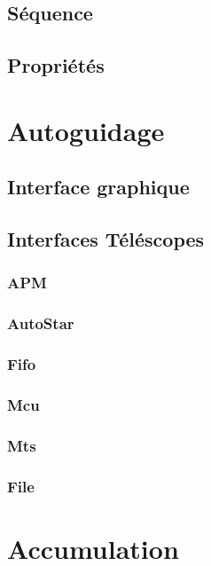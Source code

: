 \documentclass[11pt,a4paper]{book}
\begin{document}
\section{S\'equence}

\section{Propri\'et\'es}

\chapter{Autoguidage}

\section{Interface graphique}

\section{Interfaces T\'el\'escopes}

\subsection{APM}

\subsection{AutoStar}

\subsection{Fifo}

\subsection{Mcu}

\subsection{Mts}

\subsection{File}

\chapter{Accumulation}
\end{document}
